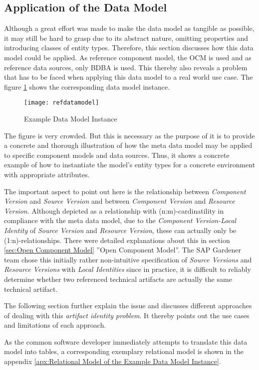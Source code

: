 \subsection{Application of the Data Model} \label{sec:Application of the Data Model}
Although a great effort was made to make the data model as tangible as possible, it may still be hard to grasp due to its abstract nature, omitting properties and introducing classes of entity types. Therefore, this section discusses how this data model could be applied. As reference component model, the OCM is used and as reference data sources, only BDBA is used. This thereby also reveals a problem that has to be faced when applying this data model to a real world use case. The figure \ref{fig:RefDataModel} shows the corresponding data model instance.\par

\begin{figure}[H]
	\centering
	\texttt{[image: refdatamodel]}
	\caption[Data Model Instance]{Example Data Model Instance }
	\label{fig:RefDataModel}
\end{figure}

The figure is very crowded. But this is necessary as the purpose of it is to provide a concrete and thorough illustration of how the meta data model may be applied to specific component models and data sources. Thus, it shows a concrete example of how to instantiate the model's entity types for a concrete environment with appropriate attributes.\par
The important aspect to point out here is the relationship between \emph{Component Version} and \emph{Source Version} and between \emph{Component Version} and \emph{Resource Version}. Although depicted as a relationship with (n:m)-cardinatility in compliance with the meta data model, due to the \emph{Component Version-Local Identity} of \emph{Source Version} and \emph{Resource Version}, these can actually only be (1:n)-relationships. There were detailed explanations about this in section \ref{sec:Open Component Model} ''Open Component Model''. The SAP Gardener team chose this initially rather non-intuitive specification of \emph{Source Versions} and \emph{Resource Versions} with \emph{Local Identities} since in practice, it is difficult to reliably determine whether two referenced technical artifacts are actually the same technical artifact.\par 
The following section further explain the issue and discusses different approaches of dealing with this \emph{artifact identity problem}. It thereby points out the use cases and limitations of each approach.\par
As the common software developer immediately attempts to translate this data model into tables, a corresponding exemplary relational model is shown in the appendix \ref{apx:Relational Model of the Example Data Model Instance}.  

